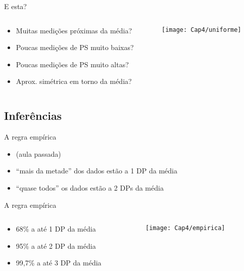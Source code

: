 \documentclass{beamer}
\begin{document}
\begin{frame}{E esta?}
  \begin{columns}
    \begin{column}{5cm}
      \begin{itemize}
      \item Muitas medições próximas da média?
      \item Poucas medições de PS muito baixas?
      \item Poucas medições de PS muito altas?
      \item Aprox. simétrica em torno da média?
      \end{itemize}
    \end{column}
    \begin{column}{5cm}
      \texttt{[image: Cap4/uniforme]}
    \end{column}
  \end{columns}
\end{frame}

\subsection{Inferências}

\begin{frame}{A regra empírica}
  \begin{itemize}
  \item (aula passada)
  \item ``mais da metade'' dos dados estão a 1 DP da média
  \item ``quase todos'' os dados estão a 2 DPs da média
  \end{itemize}
\end{frame}

\begin{frame}{A regra empírica}
  \begin{columns}
    \begin{column}{5cm}
      \begin{itemize}
      \item 68\% a até 1 DP da média
      \item 95\% a até 2 DP da média
      \item 99,7\% a até 3 DP da média
      \end{itemize}
    \end{column}
    \begin{column}{5cm}
      \texttt{[image: Cap4/empirica]}
    \end{column}
  \end{columns}
\end{frame}
\end{document}
